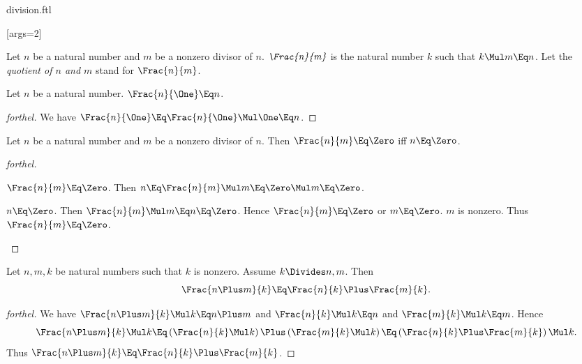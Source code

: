 \documentclass{stex}
\begin{document}
\begin{smodule}{division.ftl}


[args=2]{}


\begin{definition*}[forthel,for=quotient]
  Let $n$ be a natural number and $m$ be a nonzero divisor of $n$.
  $\emph{\Frac{n}{m}}$ is the natural number $k$ such that $k \Mul m \Eq n$.
  Let the \emph{quotient of $n$ and $m$} stand for $\Frac{n}{m}$.
\end{definition*}

\begin{proposition*}[forthel]
  Let $n$ be a natural number.
  $\Frac{n}{\One} \Eq n$.
\end{proposition*}
\begin{proof}[forthel]
  We have $\Frac{n}{\One}
    \Eq \Frac{n}{\One} \Mul \One
    \Eq n$.
\end{proof}

\begin{proposition*}[forthel]
  Let $n$ be a natural number and $m$ be a nonzero divisor of $n$.
  Then $\Frac{n}{m} \Eq \Zero$ iff $n \Eq \Zero$.
\end{proposition*}
\begin{proof}[forthel]
  \begin{case}{$\Frac{n}{m} \Eq \Zero$.}
    Then $n
      \Eq \Frac{n}{m} \Mul m
      \Eq \Zero \Mul m
      \Eq \Zero$.
  \end{case}

  \begin{case}{$n \Eq \Zero$.}
    Then $\Frac{n}{m} \Mul m
      \Eq n
      \Eq \Zero$.
    Hence $\Frac{n}{m} \Eq \Zero$ or $m \Eq \Zero$.
    $m$ is nonzero.
    Thus $\Frac{n}{m} \Eq \Zero$.
  \end{case}
\end{proof}

\begin{proposition*}[forthel]
  Let $n, m, k$ be natural numbers such that $k$ is nonzero.
  Assume $k \Divides n,m$.
  Then \[\Frac{n \Plus m}{k} \Eq \Frac{n}{k} \Plus \Frac{m}{k}.\]
\end{proposition*}
\begin{proof}[forthel]
  We have $\Frac{n \Plus m}{k} \Mul k \Eq n \Plus m$ and $\Frac{n}{k} \Mul k \Eq n$ and $\Frac{m}{k} \Mul k \Eq m$.
  Hence
  \[  \Frac{n \Plus m}{k} \Mul k
      \Eq \left( \Frac{n}{k} \Mul k \right) \Plus \left( \Frac{m}{k} \Mul k \right)
      \Eq \left( \Frac{n}{k} \Plus \Frac{m}{k} \right) \Mul k. \]
  Thus $\Frac{n \Plus m}{k} \Eq \Frac{n}{k} \Plus \Frac{m}{k}$.
\end{proof}


\end{smodule}
\end{document}

